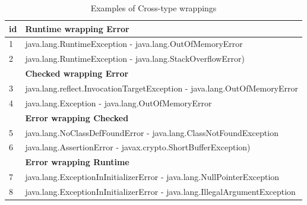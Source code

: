 \documentclass[conference]{IEEEtran}
\begin{document}
\begin{table}
\centering

\begin{tabular}{ll}
    \hline
 id & \bfseries{Runtime wrapping Error}    \\  %
    \hline
1 & java.lang.RuntimeException - java.lang.OutOfMemoryError  \\ %
2& java.lang.RuntimeException -  java.lang.StackOverflowError)   \\ %
\hline
& \bfseries{Checked wrapping Error}  \\
 \hline
3&java.lang.reflect.InvocationTargetException - java.lang.OutOfMemoryError  \\ %
4&java.lang.Exception - java.lang.OutOfMemoryError   \\ %
\hline
& \bfseries{Error wrapping Checked}  \\
 \hline
5&java.lang.NoClassDefFoundError - java.lang.ClassNotFoundException   \\ %
6&java.lang.AssertionError - javax.crypto.ShortBufferException)   \\ %
\hline
& \bfseries{Error wrapping Runtime}    \\
 \hline
7&java.lang.ExceptionInInitializerError - java.lang.NullPointerException   \\ %
8&java.lang.ExceptionInInitializerError - java.lang.IllegalArgumentException 	 \\ %
 \hline
  \end{tabular}
\caption{Examples of Cross-type wrappings}
\label{tab:exampeswrap}
\end{table}
\end{document}
